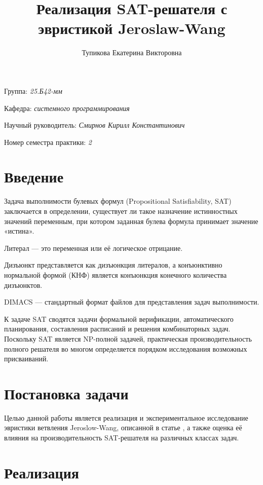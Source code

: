 \documentclass[a4paper]{article}
\title{Реализация SAT-решателя с эвристикой Jeroslaw-Wang}
\author{Тупикова Екатерина Викторовна}
\date{}
\begin{document}
\maketitle

\begin{flushright}
    Группа: \emph{25.Б42-мм}

    Кафедра: \emph{системного программирования}

    Научный руководитель: \emph{Смирнов Кирилл Константинович}

    Номер семестра практики: \emph{2}
\end{flushright} 


\section{Введение}
Задача выполнимости булевых формул (Propositional Satisfiability, SAT) заключается в определении, существует ли такое назначение истинностных значений переменным, при котором заданная булева формула принимает значение «истина».

Литерал — это переменная или её логическое отрицание.

Дизъюнкт представляется как дизъюнкция литералов, а конъюнктивно нормальной формой (КНФ) является конъюнкция конечного количества дизъюнктов. 

DIMACS — стандартный формат файлов для представления задач выполнимости. 

К задаче SAT сводятся задачи формальной верификации, автоматического
планирования, составления расписаний и решения комбинаторных задач. Поскольку
SAT является NP-полной задачей, практическая производительность полного решателя
во многом определяется порядком исследования возможных присваиваний.

\section{Постановка задачи}

Целью данной работы является реализация и экспериментальное исследование эвристики ветвления Jeroslow-Wang, описанной в статье \cite{marques1999}, а также оценка её влияния на производительность SAT-решателя на различных классах задач.

\section{Реализация}
\end{document}
